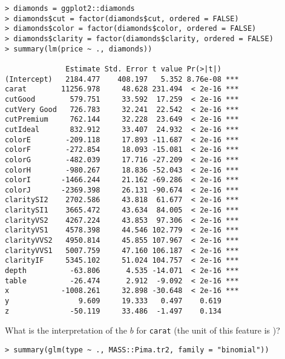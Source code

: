\documentclass[12pt]{article}
\begin{document}
\begin{enumerate}


\begin{verbatim}
> diamonds = ggplot2::diamonds
> diamonds$cut = factor(diamonds$cut, ordered = FALSE)
> diamonds$color = factor(diamonds$color, ordered = FALSE)
> diamonds$clarity = factor(diamonds$clarity, ordered = FALSE)
> summary(lm(price ~ ., diamonds))

              Estimate Std. Error t value Pr(>|t|)    
(Intercept)   2184.477    408.197   5.352 8.76e-08 ***
carat        11256.978     48.628 231.494  < 2e-16 ***
cutGood        579.751     33.592  17.259  < 2e-16 ***
cutVery Good   726.783     32.241  22.542  < 2e-16 ***
cutPremium     762.144     32.228  23.649  < 2e-16 ***
cutIdeal       832.912     33.407  24.932  < 2e-16 ***
colorE        -209.118     17.893 -11.687  < 2e-16 ***
colorF        -272.854     18.093 -15.081  < 2e-16 ***
colorG        -482.039     17.716 -27.209  < 2e-16 ***
colorH        -980.267     18.836 -52.043  < 2e-16 ***
colorI       -1466.244     21.162 -69.286  < 2e-16 ***
colorJ       -2369.398     26.131 -90.674  < 2e-16 ***
claritySI2    2702.586     43.818  61.677  < 2e-16 ***
claritySI1    3665.472     43.634  84.005  < 2e-16 ***
clarityVS2    4267.224     43.853  97.306  < 2e-16 ***
clarityVS1    4578.398     44.546 102.779  < 2e-16 ***
clarityVVS2   4950.814     45.855 107.967  < 2e-16 ***
clarityVVS1   5007.759     47.160 106.187  < 2e-16 ***
clarityIF     5345.102     51.024 104.757  < 2e-16 ***
depth          -63.806      4.535 -14.071  < 2e-16 ***
table          -26.474      2.912  -9.092  < 2e-16 ***
x            -1008.261     32.898 -30.648  < 2e-16 ***
y                9.609     19.333   0.497    0.619    
z              -50.119     33.486  -1.497    0.134    
\end{verbatim}

What is the interpretation of the $b$ for \texttt{carat} (the unit of this feature is )?



\vspace{-0.2cm}
\begin{verbatim}
> summary(glm(type ~ ., MASS::Pima.tr2, family = "binomial"))


\end{verbatim}
\end{enumerate}
\end{document}
